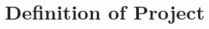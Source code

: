 \chapter{Definition of Project}
\begin{figure}[H]
	\centering
	\setlength\fboxsep{0pt}
	\setlength\fboxrule{0.5pt}
\end{figure}
